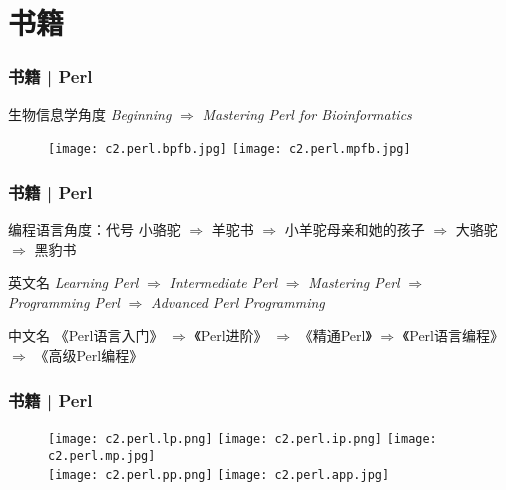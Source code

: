 \section{书籍}
\begin{frame}
  \frametitle{书籍 | Perl}
  \begin{block}{生物信息学角度}
    \textit{Beginning} $\Longrightarrow$ \textit{Mastering Perl for Bioinformatics}
  \end{block}
  \begin{figure}
    \centering
    \texttt{[image: c2.perl.bpfb.jpg]}
    \hspace{1em}
    \texttt{[image: c2.perl.mpfb.jpg]}
  \end{figure}
\end{frame}

\begin{frame}
  \frametitle{书籍 | Perl}
  \begin{block}{编程语言角度：代号}
小骆驼 $\Rightarrow$ 羊驼书 $\Rightarrow$ 小羊驼母亲和她的孩子 $\Rightarrow$ 大骆驼 $\Rightarrow$ 黑豹书
  \end{block}
  \pause
  \begin{block}{英文名}
    \textit{Learning Perl} $\Rightarrow$ \textit{Intermediate Perl} $\Rightarrow$ \textit{Mastering Perl} $\Rightarrow$ \textit{Programming Perl} $\Rightarrow$ \textit{Advanced Perl Programming}
  \end{block}
  \pause
  \begin{block}{中文名}
    《Perl语言入门》 $\Rightarrow$ 《Perl进阶》 $\Rightarrow$ 《精通Perl》 $\Rightarrow$ 《Perl语言编程》 $\Rightarrow$ 《高级Perl编程》
  \end{block}
  \pause
\end{frame}

\begin{frame}
  \frametitle{书籍 | Perl}
  \begin{figure}
    \centering
    \texttt{[image: c2.perl.lp.png]}
    \qquad
    \texttt{[image: c2.perl.ip.png]}
    \qquad
    \texttt{[image: c2.perl.mp.jpg]}\\
    \texttt{[image: c2.perl.pp.png]}
    \hspace{2cm}
    \texttt{[image: c2.perl.app.jpg]}
  \end{figure}
\end{frame}

